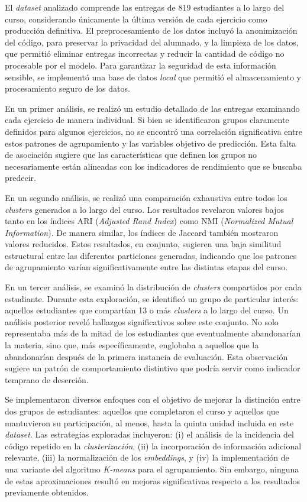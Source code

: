 \documentclass[11pt,a4paper,twoside,openany]{tesis}
\begin{document}
El \emph{dataset} analizado comprende las entregas de 819 estudiantes a lo largo del curso, considerando únicamente la última versión de cada ejercicio como producción definitiva. El preprocesamiento de los datos incluyó la anonimización del código, para preservar la privacidad del alumnado, y la limpieza de los datos, que permitió eliminar entregas incorrectas y reducir la cantidad de código no procesable por el modelo. Para garantizar la seguridad de esta información sensible, se implementó una base de datos \emph{local} que permitió el almacenamiento y procesamiento seguro de los datos.

En un primer análisis, se realizó un estudio detallado de las entregas examinando cada ejercicio de manera individual. Si bien se identificaron grupos claramente definidos para algunos ejercicios, no se encontró una correlación significativa entre estos patrones de agrupamiento y las variables objetivo de predicción. Esta falta de asociación sugiere que las características que definen los grupos no necesariamente están alineadas con los indicadores de rendimiento que se buscaba predecir.

En un segundo análisis, se realizó una comparación exhaustiva entre todos los \emph{clusters} generados a lo largo del curso. Los resultados revelaron valores bajos tanto en los índices ARI (\emph{Adjusted Rand Index}) como NMI (\emph{Normalized Mutual Information}). De manera similar, los índices de Jaccard también mostraron valores reducidos. Estos resultados, en conjunto, sugieren una baja similitud estructural entre las diferentes particiones generadas, indicando que los patrones de agrupamiento varían significativamente entre las distintas etapas del curso.

En un tercer análisis, se examinó la distribución de \emph{clusters} compartidos por cada estudiante. Durante esta exploración, se identificó un grupo de particular interés: aquellos estudiantes que compartían 13 o más \emph{clusters} a lo largo del curso. Un análisis posterior reveló hallazgos significativos sobre este conjunto. No solo representaba más de la mitad de los estudiantes que eventualmente abandonarían la materia, sino que, más específicamente, englobaba a aquellos que la abandonarían después de la primera instancia de evaluación. Esta observación sugiere un patrón de comportamiento distintivo que podría servir como indicador temprano de deserción.

Se implementaron diversos enfoques con el objetivo de mejorar la distinción entre dos grupos de estudiantes: aquellos que completaron el curso y aquellos que mantuvieron su participación, al menos, hasta la quinta unidad incluida en este \emph{dataset}. Las estrategias exploradas incluyeron: (i) el análisis de la incidencia del código repetido en la \emph{clusterización}, (ii) la incorporación de información adicional relevante, (iii) la normalización de los \emph{embeddings}, y (iv) la implementación de una variante del algoritmo \emph{K-means} para el agrupamiento. Sin embargo, ninguna de estas aproximaciones resultó en mejoras significativas respecto a los resultados previamente obtenidos.
\end{document}

